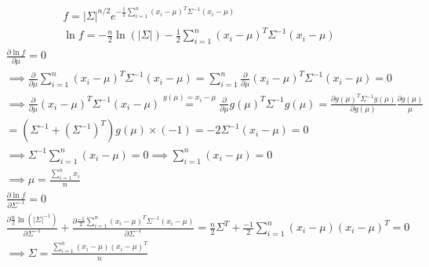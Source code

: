 \\
\begin{gather*}
    f = |\Sigma|^{n/2} e^{-\frac{1}{2} \sum_{i=1}^n (x_i-\mu)^T \Sigma^{-1} (x_i-\mu)}\\
    \ln f = -\frac{n}{2} \ln (|\Sigma|) -\frac{1}{2} \sum_{i=1}^n (x_i-\mu)^T \Sigma^{-1} (x_i-\mu)
\end{gather*}
\begin{gather*}
    \frac{\partial \ln f}{\partial \mu} = 0\\
    \implies \frac{\partial}{\partial \mu} \sum_{i=1}^n (x_i-\mu)^T \Sigma^{-1} (x_i-\mu) = \sum_{i=1}^n \frac{\partial}{\partial \mu} (x_i-\mu)^T \Sigma^{-1} (x_i-\mu) = 0\\
    \implies \frac{\partial}{\partial \mu} (x_i-\mu)^T \Sigma^{-1} (x_i-\mu) \stackrel{g(\mu) = x_i - \mu}{=} \frac{\partial}{\partial \mu} g(\mu)^T \Sigma^{-1} g(\mu)
    = \frac{\partial g(\mu)^T \Sigma^{-1} g(\mu)}{\partial g(\mu)} \frac{\partial g(\mu)}{\mu}\\
    = (\Sigma^{-1} + (\Sigma^{-1})^T) g(\mu) \times (-1) = -2\Sigma^{-1} (x_i - \mu) = 0\\
    \implies \Sigma^{-1} \sum_{i=1}^n (x_i - \mu) = 0 \implies \sum_{i=1}^n (x_i - \mu) = 0\\
    \implies \mu = \frac{\sum_{i=1}^n x_i}{n}
\end{gather*}
\begin{gather*}
    \frac{\partial \ln f}{\partial \Sigma^{-1}} = 0\\
    \frac{\partial \frac{n}{2} \ln (|\Sigma|^{-1})}{\partial \Sigma^{-1}} + \frac{\partial \frac{-1}{2} \sum_{i=1}^n (x_i-\mu)^T \Sigma^{-1} (x_i-\mu)}{\partial \Sigma^{-1}} =
    \frac{n}{2} \Sigma^T + \frac{-1}{2} \sum_{i=1}^{n} (x_i-\mu) (x_i-\mu)^T = 0\\
    \implies \Sigma = \frac{\sum_{i=1}^{n} (x_i-\mu) (x_i-\mu)^T}{n}
\end{gather*}